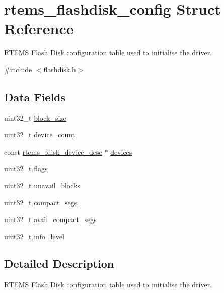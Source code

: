 \hypertarget{structrtems__flashdisk__config}{}\section{rtems\+\_\+flashdisk\+\_\+config Struct Reference}
\label{structrtems__flashdisk__config}


R\+T\+E\+MS Flash Disk configuration table used to initialise the driver.  




{\ttfamily \#include $<$flashdisk.\+h$>$}

\subsection*{Data Fields}
\begin{DoxyCompactItemize}
\item 
uint32\+\_\+t \mbox{\hyperlink{structrtems__flashdisk__config_a50fe17de497dc86963fb14f36cfdf118}{block\+\_\+size}}
\item 
uint32\+\_\+t \mbox{\hyperlink{structrtems__flashdisk__config_a7fc7be0683fa49cdafd26c536e357ac1}{device\+\_\+count}}
\item 
const \mbox{\hyperlink{structrtems__fdisk__device__desc}{rtems\+\_\+fdisk\+\_\+device\+\_\+desc}} $\ast$ \mbox{\hyperlink{structrtems__flashdisk__config_a7444ecefbfec131ca32d608634b31a3d}{devices}}
\item 
uint32\+\_\+t \mbox{\hyperlink{structrtems__flashdisk__config_a16d44d1db2e877e5671a9c229b3b4db1}{flags}}
\item 
uint32\+\_\+t \mbox{\hyperlink{structrtems__flashdisk__config_ad06eb8b2ba70e0207374aad689d55649}{unavail\+\_\+blocks}}
\item 
uint32\+\_\+t \mbox{\hyperlink{structrtems__flashdisk__config_a7b622c625af71aa93caddca226de7a85}{compact\+\_\+segs}}
\item 
uint32\+\_\+t \mbox{\hyperlink{structrtems__flashdisk__config_a24b0928570dd72694937dee16ebbc4e5}{avail\+\_\+compact\+\_\+segs}}
\item 
uint32\+\_\+t \mbox{\hyperlink{structrtems__flashdisk__config_a335a00f9e02f56e5c8f6ec07dcd2229b}{info\+\_\+level}}
\end{DoxyCompactItemize}


\subsection{Detailed Description}
R\+T\+E\+MS Flash Disk configuration table used to initialise the driver. 

